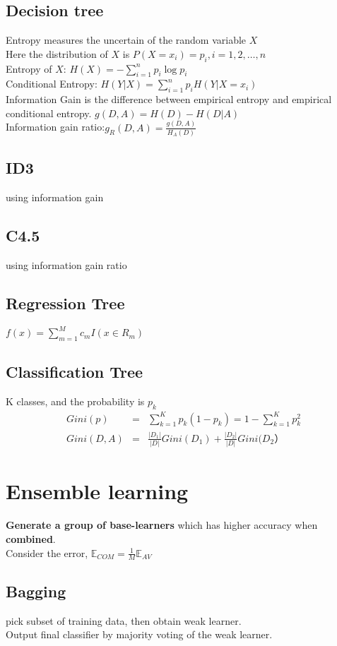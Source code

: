 \documentclass[12pt,a4paper]{article}
\begin{document}
\subsection*{Decision tree}
Entropy measures the uncertain of the random variable $X$\\
Here the distribution of $X$ is $P(X=x_i)=p_i, i=1,2,\ldots,n$ \\
Entropy of $X$: $H(X) = -\sum_{i=1}^{n}p_i\log p_i$ \\
Conditional Entropy: $H(Y|X)=\sum_{i=1}^{n}p_iH(Y|X=x_i)$ \\
Information Gain is the difference between empirical entropy and empirical conditional entropy.
$g(D,A) = H(D)-H(D|A)$\\
Information gain ratio:$g_R(D,A)=\frac{g(D,A)}{H_A(D)}$
\subsection*{ID3}
using information gain
\subsection*{C4.5}
using information gain ratio
\subsection*{Regression Tree}
$f(x)=\sum_{m=1}^{M}c_mI(x\in R_m)$
\subsection*{Classification Tree}
K classes, and the probability is $p_k$\\
\begin{eqnarray*}
Gini(p) &=& \sum_{k=1}^{K}p_k(1-p_k)=1-\sum_{k=1}^{K}p_k^2\\
Gini(D,A) &=& \frac{|D_1|}{|D|}Gini(D_1)+\frac{|D_2|}{|D|}Gini(D_2）
\end{eqnarray*}
\section*{Ensemble learning}
\textbf{Generate a group of base-learners} which has higher accuracy when \textbf{combined}.\\
Consider the error, $\mathbb{E}_{COM} = \frac{1}{M}\mathbb{E}_{AV}$
\subsection*{Bagging}
pick subset of training data, then obtain weak learner.\\
Output final classifier by majority voting of the weak learner.\\
\end{document}
